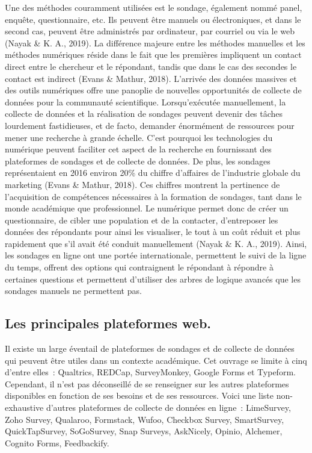 \documentclass[
  letterpaper,
]{scrbook}
\begin{document}
\hfill\break
Une des méthodes couramment utilisées est le sondage, également nommé
panel, enquête, questionnaire, etc. Ils peuvent être manuels ou
électroniques, et dans le second cas, peuvent être administrés par
ordinateur, par courriel ou via le web (Nayak \& K. A., 2019). La
différence majeure entre les méthodes manuelles et les méthodes
numériques réside dans le fait que les premières impliquent un contact
direct entre le chercheur et le répondant, tandis que dans le cas des
secondes le contact est indirect (Evans \& Mathur, 2018). L'arrivée des
données massives et des outils numériques offre une panoplie de
nouvelles opportunités de collecte de données pour la communauté
scientifique. Lorsqu'exécutée manuellement, la collecte de données et la
réalisation de sondages peuvent devenir des tâches lourdement
fastidieuses, et de facto, demander énormément de ressources pour mener
une recherche à grande échelle. C'est pourquoi les technologies du
numérique peuvent faciliter cet aspect de la recherche en fournissant
des plateformes de sondages et de collecte de données. De plus, les
sondages représentaient en 2016 environ 20\% du chiffre d'affaires de
l'industrie globale du marketing (Evans \& Mathur, 2018). Ces chiffres
montrent la pertinence de l'acquisition de compétences nécessaires à la
formation de sondages, tant dans le monde académique que professionnel.
Le numérique permet donc de créer un questionnaire, de cibler une
population et de la contacter, d'entreposer les données des répondants
pour ainsi les visualiser, le tout à un coût réduit et plus rapidement
que s'il avait été conduit manuellement (Nayak \& K. A., 2019). Ainsi,
les sondages en ligne ont une portée internationale, permettent le suivi
de la ligne du temps, offrent des options qui contraignent le répondant
à répondre à certaines questions et permettent d'utiliser des arbres de
logique avancés que les sondages manuels ne permettent pas.

\hypertarget{les-principales-plateformes-web.}{%
\subsection{Les principales plateformes
web.}\label{les-principales-plateformes-web.}}

\hfill\break
Il existe un large éventail de plateformes de sondages et de collecte de
données qui peuvent être utiles dans un contexte académique. Cet ouvrage
se limite à cinq d'entre elles~: Qualtrics, REDCap, SurveyMonkey, Google
Forms et Typeform. Cependant, il n'est pas déconseillé de se renseigner
sur les autres plateformes disponibles en fonction de ses besoins et de
ses ressources. Voici une liste non-exhaustive d'autres plateformes de
collecte de données en ligne~: LimeSurvey, Zoho Survey, Qualaroo,
Formstack, Wufoo, Checkbox Survey, SmartSurvey, QuickTapSurvey,
SoGoSurvey, Snap Surveys, AskNicely, Opinio, Alchemer, Cognito Forms,
Feedbackify.
\end{document}
